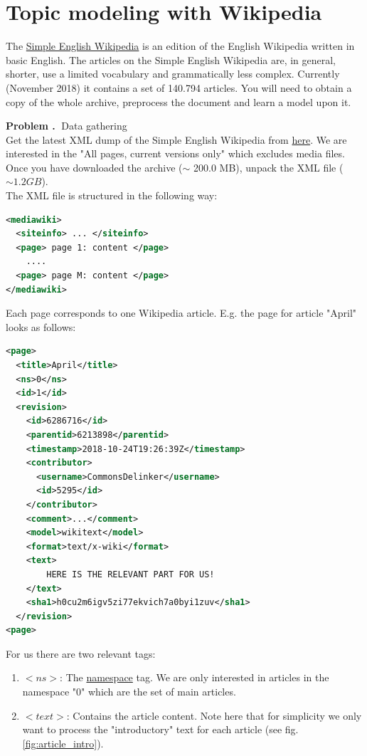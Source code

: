 \documentclass[10pt]{article}
\newcounter{problemCounter}
\newenvironment{problem}[1]
{
	\vspace{0.5cm}
	\refstepcounter{problemCounter}\label{#1}
	\noindent \textbf{Problem \theproblemCounter.$\;$} 
}{}
\begin{document}
\section{Topic modeling with Wikipedia}

The \href{https://simple.wikipedia.org/wiki/Main_Page}{Simple English Wikipedia} is an edition of the English Wikipedia written in basic English. The articles on the Simple English Wikipedia are, in general, shorter, use a limited vocabulary and grammatically less complex. Currently (November 2018) it contains a set of 140.794 articles. You will need to obtain a copy of the whole archive, preprocess the document and learn a model upon it.

\begin{problem}
	DData gathering \\
	Get the latest XML dump of the Simple English Wikipedia from  \href{https://dumps.wikimedia.org/simplewiki/20181120/}{here}. We are interested in the "All pages, current versions only" which excludes media files. Once you have downloaded the archive ($\sim$ 200.0 MB), unpack the XML file ($\sim 1.2 GB$).
\end{problem} \\
The XML file is structured in the following way:
\begin{lstlisting}[language=XML]
<mediawiki>
  <siteinfo> ... </siteinfo>
  <page> page 1: content </page>
    ....
  <page> page M: content </page>
</mediawiki>
\end{lstlisting}
Each page corresponds to one Wikipedia article. E.g. the page for article "April" looks as follows:
\begin{lstlisting}[language=XML]
<page>
  <title>April</title>
  <ns>0</ns>
  <id>1</id>
  <revision>
    <id>6286716</id>
    <parentid>6213898</parentid>
    <timestamp>2018-10-24T19:26:39Z</timestamp>
    <contributor>
      <username>CommonsDelinker</username>
      <id>5295</id>
    </contributor>
    <comment>...</comment>
    <model>wikitext</model>
    <format>text/x-wiki</format>
    <text>
        HERE IS THE RELEVANT PART FOR US!
    </text>
    <sha1>h0cu2m6igv5zi77ekvich7a0byi1zuv</sha1>
  </revision>
<page>
\end{lstlisting}
For us there are two relevant tags:
\begin{enumerate}
  \item $<ns>$: The \href{https://en.wikipedia.org/wiki/Wikipedia:Namespace}{namespace} tag. We are only interested in articles in the namespace "$0$" which are the set of main articles.
  \item $<text>$: Contains the article content. Note here that for simplicity we only want to process the "introductory" text for each article (see fig. \ref{fig:article_intro}).
\end{enumerate}
\end{document}
